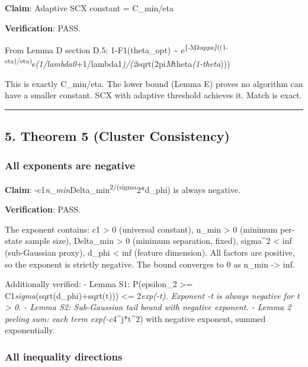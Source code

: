 \documentclass[
  12pt,
]{article}
\begin{document}
\textbf{Claim}: Adaptive SCX constant = C\_min/eta

\textbf{Verification}: PASS.

From Lemma D section D.5: 1-F1(theta\_opt) \textasciitilde{}
e\textsuperscript{\{-M\emph{kappa\}}((1-eta)/eta)}s\emph{(1/lambda0}+1/\textbar lambda1\emph{\textbar)/(2}sqrt(2pi\emph{M}theta\emph{(1-theta})))

This is exactly C\_min/eta. The lower bound (Lemma E) proves no
algorithm can have a smaller constant. SCX with adaptive threshold
achieves it. Match is exact.

\begin{center}\rule{0.5\linewidth}{0.5pt}\end{center}

\subsection{5. Theorem 5 (Cluster
Consistency)}\label{theorem-5-cluster-consistency}

\subsubsection{All exponents are
negative}\label{all-exponents-are-negative}

\textbf{Claim}:
-c1\emph{n\_min}Delta\_min\textsuperscript{2/(sigma}2*d\_phi) is always
negative.

\textbf{Verification}: PASS.

The exponent contains: c1 \textgreater{} 0 (universal constant), n\_min
\textgreater{} 0 (minimum per-state sample size), Delta\_min
\textgreater{} 0 (minimum separation, fixed), sigma\^{}2 \textless{} inf
(sub-Gaussian proxy), d\_phi \textless{} inf (feature dimension). All
factors are positive, so the exponent is strictly negative. The bound
converges to 0 as n\_min -\textgreater{} inf.

Additionally verified: - Lemma S1:
P(\textbar\textbar epsilon\textbar\textbar\_2 \textgreater=
C1\emph{sigma}(sqrt(d\_phi)+sqrt(t))) \textless= 2\emph{exp(-t).
Exponent -t is always negative for t \textgreater{} 0. - Lemma S2:
Sub-Gaussian tail bound with negative exponent. - Lemma 2 peeling sum:
each term exp(-c}4\^{}j*t\^{}2) with negative exponent, summed
exponentially.

\subsubsection{All inequality
directions}\label{all-inequality-directions}
\end{document}
